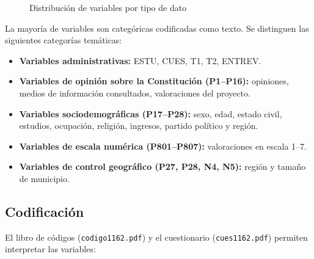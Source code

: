 \documentclass[12pt,a4paper]{article}
\begin{document}
\begin{figure}[H]
\centering
{}
\caption{Distribución de variables por tipo de dato}
\end{figure}

La mayoría de variables son categóricas codificadas como texto. Se distinguen las siguientes categorías temáticas:

\begin{itemize}[leftmargin=1.5em]
  \item \textbf{Variables administrativas:} ESTU, CUES, T1, T2, ENTREV.
  \item \textbf{Variables de opinión sobre la Constitución (P1--P16):} opiniones, medios de información consultados, valoraciones del proyecto.
  \item \textbf{Variables sociodemográficas (P17--P28):} sexo, edad, estado civil, estudios, ocupación, religión, ingresos, partido político y región.
  \item \textbf{Variables de escala numérica (P801--P807):} valoraciones en escala 1--7.
  \item \textbf{Variables de control geográfico (P27, P28, N4, N5):} región y tamaño de municipio.
\end{itemize}

\subsection{Codificación}

El libro de códigos (\texttt{codigo1162.pdf}) y el cuestionario (\texttt{cues1162.pdf}) permiten interpretar las variables:
\end{document}
